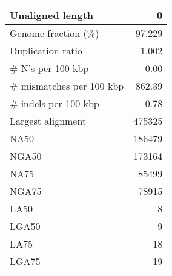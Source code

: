 \documentclass[12pt,a4paper]{article}
\begin{document}
\begin{table}[ht]
\begin{center}
\begin{tabular}{|l*{1}{|r}|}
Unaligned length & 0 \\ \hline
Genome fraction (\%) & 97.229 \\ \hline
Duplication ratio & 1.002 \\ \hline
\# N's per 100 kbp & 0.00 \\ \hline
\# mismatches per 100 kbp & 862.39 \\ \hline
\# indels per 100 kbp & 0.78 \\ \hline
Largest alignment & 475325 \\ \hline
NA50 & 186479 \\ \hline
NGA50 & 173164 \\ \hline
NA75 & 85499 \\ \hline
NGA75 & 78915 \\ \hline
LA50 & 8 \\ \hline
LGA50 & 9 \\ \hline
LA75 & 18 \\ \hline
LGA75 & 19 \\ \hline
\end{tabular}
\end{center}
\end{table}
\end{document}
